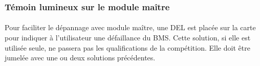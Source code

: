 	\subsubsection{Témoin lumineux sur le module maître}
		\paragraph*{}
		Pour faciliter le dépannage avec module maître, une DEL est placée sur la carte pour indiquer à l'utilisateur une défaillance du BMS. Cette solution, si elle est utilisée seule, ne passera pas les qualifications de la compétition. Elle doit être jumelée avec une ou deux solutions précédentes.
		
